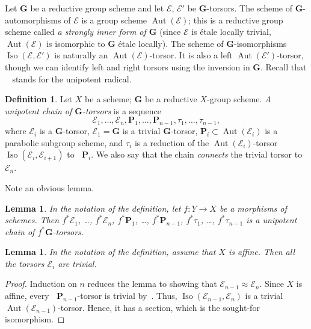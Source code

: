 \documentclass[11pt]{amsart}
\DeclareMathOperator\Ru{R_u}
\DeclareMathOperator{\Aut}{Aut}
\DeclareMathOperator{\Iso}{Iso}
\theoremstyle{plain}
\newtheorem{lemma}[proposition]{Lemma}
\theoremstyle{definition}
\newtheorem{definition}[proposition]{Definition}
\theoremstyle{remark}
\newcommand\cE{{\mathcal{E}}}
\newcommand\bG{{\mathbf G}}
\newcommand\bP{{\mathbf P}}
\begin{document}
Let $\bG$ be a reductive group scheme and let $\cE$, $\cE'$ be $\bG$-torsors. The scheme of $\bG$-automorphisms of $\cE$ is a group scheme $\Aut(\cE)$; this is a reductive group scheme called \emph{a strongly inner form of $\bG$} (since $\cE$ is \'etale locally trivial, $\Aut(\cE)$ is isomorphic to $\bG$ \'etale locally). The scheme of $\bG$-isomorphisms $\Iso(\cE,\cE')$ is naturally an $\Aut(\cE)$-torsor. It is also a left $\Aut(\cE')$-torsor, though we can identify left and right torsors using the inversion in $\bG$. Recall that $\Ru$ stands for the unipotent radical.
\begin{definition}\label{def:UnipChain}
Let $X$ be a scheme; $\bG$ be a reductive $X$-group scheme. \emph{A unipotent chain of $\bG$-torsors} is a sequence
\begin{equation}\label{eq:chain}
\cE_1, \ldots, \cE_n, \bP_1, \ldots, \bP_{n-1}, \tau_1, \ldots, \tau_{n-1},
\end{equation}
where $\cE_i$ is a $\bG$-torsor, $\cE_1=\bG$ is a trivial $\bG$-torsor, $\bP_i\subset\Aut(\cE_i)$ is a parabolic subgroup scheme, and $\tau_i$ is a reduction of the $\Aut(\cE_i)$-torsor $\Iso(\cE_i,\cE_{i+1})$ to $\Ru\bP_i$. We also say that the chain \emph{connects} the trivial torsor to $\cE_n$.
\end{definition}
Note an obvious lemma.
\begin{lemma}\label{lm:ChainPullback}
  In the notation of the definition, let $f\colon Y\to X$ be a morphisms of schemes. Then $f^*\cE_1$, \ldots, $f^*\cE_n$, $f^*\bP_1$, \ldots, $f^*\bP_{n-1}$, $f^*\tau_1$, \ldots, $f^*\tau_{n-1}$ is a unipotent chain of $f^*\bG$-torsors.
\end{lemma}
\begin{lemma}\label{lm:ChainTrivAff}
    In the notation of the definition, assume that $X$ is affine. Then all the torsors $\cE_i$ are trivial.
\end{lemma}
\begin{proof}
  Induction on $n$ reduces the lemma to showing that $\cE_{n-1}\approx\cE_n$. Since $X$ is affine, every $\Ru\bP_{n-1}$-torsor is trivial by~\cite[exp.~XXVI, cor.~2.2]{SGA3-3}. Thus, $\Iso(\cE_{n-1},\cE_n)$ is a trivial $\Aut(\cE_{n-1})$-torsor. Hence, it has a section, which is the sought-for isomorphism.
\end{proof}
\end{document}
